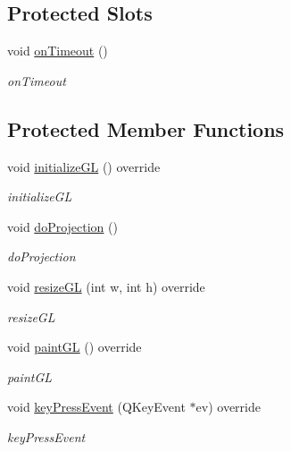 \subsection*{Protected Slots}
\begin{DoxyCompactItemize}
\item 
void \hyperlink{classGLArea_a62ff54b320abd318088f06bf861d8024}{on\+Timeout} ()
\begin{DoxyCompactList}\small\item\em on\+Timeout \end{DoxyCompactList}\end{DoxyCompactItemize}
\subsection*{Protected Member Functions}
\begin{DoxyCompactItemize}
\item 
void \hyperlink{classGLArea_a561f724c4f5a676c7d48dc4c1facab6a}{initialize\+GL} () override
\begin{DoxyCompactList}\small\item\em initialize\+GL \end{DoxyCompactList}\item 
void \hyperlink{classGLArea_a7258b85eec87415b8bdfde5a20b9bf34}{do\+Projection} ()
\begin{DoxyCompactList}\small\item\em do\+Projection \end{DoxyCompactList}\item 
void \hyperlink{classGLArea_af4aefae86c0eab7dcd5773daccca6582}{resize\+GL} (int w, int h) override
\begin{DoxyCompactList}\small\item\em resize\+GL \end{DoxyCompactList}\item 
void \hyperlink{classGLArea_a235d7e6e2dcdb4c47cf368f11686ab8f}{paint\+GL} () override
\begin{DoxyCompactList}\small\item\em paint\+GL \end{DoxyCompactList}\item 
void \hyperlink{classGLArea_a675245da4965c357b5752dfdfc610ebc}{key\+Press\+Event} (Q\+Key\+Event $\ast$ev) override
\begin{DoxyCompactList}\small\item\em key\+Press\+Event \end{DoxyCompactList}\item 

\end{DoxyCompactItemize}
